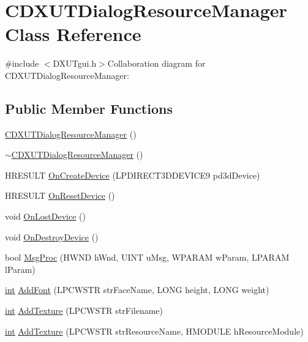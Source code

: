 \hypertarget{class_c_d_x_u_t_dialog_resource_manager}{
\section{CDXUTDialogResourceManager Class Reference}
\label{class_c_d_x_u_t_dialog_resource_manager}
}


{\ttfamily \#include $<$DXUTgui.h$>$}Collaboration diagram for CDXUTDialogResourceManager:\subsection*{Public Member Functions}
\begin{DoxyCompactItemize}
\item 
\hyperlink{class_c_d_x_u_t_dialog_resource_manager_a77adbb5c89ad5d4a74ced5f9bd393f51}{CDXUTDialogResourceManager} ()
\item 
\hyperlink{class_c_d_x_u_t_dialog_resource_manager_a0ec400706a20e2e639aef275986fad43}{$\sim$CDXUTDialogResourceManager} ()
\item 
HRESULT \hyperlink{class_c_d_x_u_t_dialog_resource_manager_a6b5ce20418b9af09844c9d4a7cede1f3}{OnCreateDevice} (LPDIRECT3DDEVICE9 pd3dDevice)
\item 
HRESULT \hyperlink{class_c_d_x_u_t_dialog_resource_manager_adda18af6feb1f6426f838949764b758c}{OnResetDevice} ()
\item 
void \hyperlink{class_c_d_x_u_t_dialog_resource_manager_a767126a6b445f88b4e31d26dde9c3e9d}{OnLostDevice} ()
\item 
void \hyperlink{class_c_d_x_u_t_dialog_resource_manager_aaf6a1da79ca795d3df60142f985d39f0}{OnDestroyDevice} ()
\item 
bool \hyperlink{class_c_d_x_u_t_dialog_resource_manager_a5eb2225e9b52752735c7557734bc009d}{MsgProc} (HWND hWnd, UINT uMsg, WPARAM wParam, LPARAM lParam)
\item 
\hyperlink{_d_x_u_tgui_8cpp_a2d77ed03302b6978834ee3b6f57837fb}{int} \hyperlink{class_c_d_x_u_t_dialog_resource_manager_a469b81ccbb955b2841ba72d183761a08}{AddFont} (LPCWSTR strFaceName, LONG height, LONG weight)
\item 
\hyperlink{_d_x_u_tgui_8cpp_a2d77ed03302b6978834ee3b6f57837fb}{int} \hyperlink{class_c_d_x_u_t_dialog_resource_manager_af5c09862641c351edb3753a36a87c79a}{AddTexture} (LPCWSTR strFilename)
\item 
\hyperlink{_d_x_u_tgui_8cpp_a2d77ed03302b6978834ee3b6f57837fb}{int} \hyperlink{class_c_d_x_u_t_dialog_resource_manager_a3f9d7c4c960b1e30a52f900283afa786}{AddTexture} (LPCWSTR strResourceName, HMODULE hResourceModule)

\end{DoxyCompactItemize}
